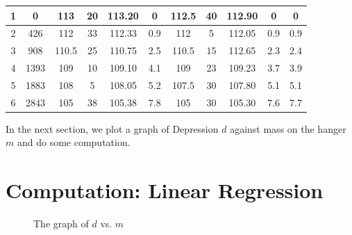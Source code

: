 \documentclass[11pt]{scrartcl}
\begin{document}
\begin{table}[h]
\begin{tabular}{|c|c|ccc|c|ccc|c|c|}
    1 & 0 & \multicolumn{1}{c|}{113} & \multicolumn{1}{c|}{20} & 113.20 & 0 & \multicolumn{1}{c|}{112.5} & \multicolumn{1}{c|}{40} & 112.90 & 0 & 0 \\ \hline
    2 & 426 & \multicolumn{1}{c|}{112} & \multicolumn{1}{c|}{33} & 112.33 & 0.9 & \multicolumn{1}{c|}{112} & \multicolumn{1}{c|}{5} & 112.05 & 0.9 & 0.9 \\ \hline
    3 & 908 & \multicolumn{1}{c|}{110.5} & \multicolumn{1}{c|}{25} & 110.75 & 2.5 & \multicolumn{1}{c|}{110.5} & \multicolumn{1}{c|}{15} & 112.65 & 2.3 & 2.4 \\ \hline
    4 & 1393 & \multicolumn{1}{c|}{109} & \multicolumn{1}{c|}{10} & 109.10 & 4.1 & \multicolumn{1}{c|}{109} & \multicolumn{1}{c|}{23} & 109.23 & 3.7 & 3.9 \\ \hline
    5 & 1883 & \multicolumn{1}{c|}{108} & \multicolumn{1}{c|}{5} & 108.05 & 5.2 & \multicolumn{1}{c|}{107.5} & \multicolumn{1}{c|}{30} & 107.80 & 5.1 & 5.1 \\ \hline
    6 & 2843 & \multicolumn{1}{c|}{105} & \multicolumn{1}{c|}{38} & 105.38 & 7.8 & \multicolumn{1}{c|}{105} & \multicolumn{1}{c|}{30} & 105.30 & 7.6 & 7.7 \\ \hline
    \end{tabular}
\end{table}
In the next section, we plot a graph of Depression \(d\) against mass on the hanger \(m\) and do some computation.

\newpage

\section{Computation: Linear Regression}
\begin{figure}[h]
    \centering
    \caption{The graph of \(d\) vs. \(m\)}
\end{figure}
\end{document}
